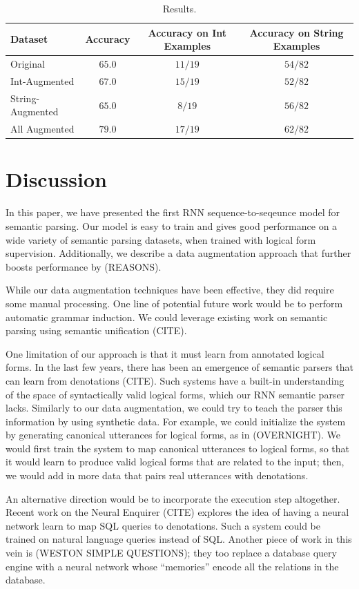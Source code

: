 \documentclass[11pt,letterpaper]{article}
\begin{document}
\begin{table}
  \centering
  \small
  \begin{tabular}{|l|c|c|c|}
    \hline
    Dataset & Accuracy & Accuracy on Int Examples & Accuracy on String Examples \\
    \hline
    Original & $65.0$ & $11/19$ & $54/82$ \\
    Int-Augmented & $67.0$ & $15/19$ & $52/82$ \\
    String-Augmented & $65.0$ & $8/19$ & $56/82$\\
    All Augmented & $79.0$ & $17/19$ & $62/82$ \\
    \hline
  \end{tabular}
  \caption{Results.}
  \label{tab:regex-shift}
\end{table}

\section{Discussion}
In this paper, we have presented the first RNN sequence-to-seqeunce
model for semantic parsing.  Our model is easy to train
and gives good performance on a wide variety of semantic parsing
datasets, when trained with logical form supervision.
Additionally, we describe a data augmentation approach that 
further boosts performance by (REASONS).

While our data augmentation techniques have been effective,
they did require some manual processing.
One line of potential future work would be to
perform automatic grammar induction.
We could leverage existing work on semantic parsing
using semantic unification (CITE).

One limitation of our approach is that it must learn from annotated logical forms.
In the last few years, there has been an emergence of
semantic parsers that can learn from denotations (CITE).
Such systems have a built-in understanding of the space of
syntactically valid logical forms, which our RNN semantic parser lacks.
Similarly to our data augmentation, we could try to
teach the parser this information by using synthetic data.
For example, we could initialize the system 
by generating canonical utterances for logical forms,
as in (OVERNIGHT).  We would first train the system to map
canonical utterances to logical forms, so that it would learn to produce
valid logical forms that are related to the input;
then, we would add in more data that pairs real utterances with denotations.

An alternative direction would be to incorporate the execution
step altogether.  Recent work on the Neural Enquirer (CITE)
explores the idea of having a neural network learn to map
SQL queries to denotations.  Such a system could be trained
on natural language queries instead of SQL.
Another piece of work in this vein is (WESTON SIMPLE QUESTIONS);
they too replace a database query engine with a neural network
whose ``memories'' encode all the relations in the database.
\end{document}
